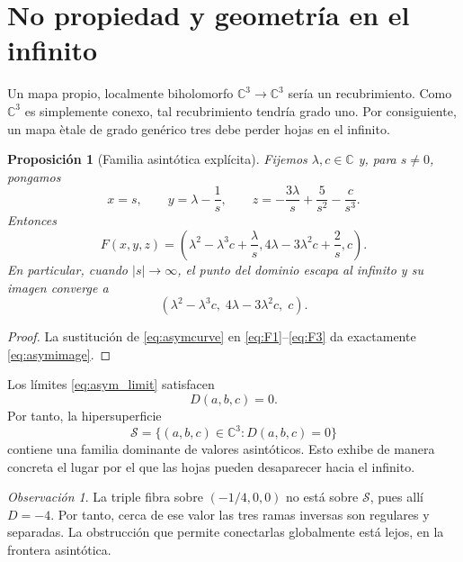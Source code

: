 \documentclass[11pt]{article}
\newtheorem{proposition}[theorem]{Proposici\'on}
\theoremstyle{definition}
\theoremstyle{remark}
\newtheorem{remark}[theorem]{Observaci\'on}
\newcommand{\C}{\mathbb{C}}
\begin{document}
\section{No propiedad y geometr\'ia en el infinito}

Un mapa propio, localmente biholomorfo $\C^3\to\C^3$ ser\'ia un recubrimiento.
Como $\C^3$ es simplemente conexo, tal recubrimiento tendr\'ia grado uno. Por
consiguiente, un mapa \`etale de grado gen\'erico tres debe perder hojas en el
infinito.

\begin{proposition}[Familia asint\'otica expl\'icita]\label{prop:asymptotic}
Fijemos $\lambda,c\in\C$ y, para $s\neq0$, pongamos
\begin{equation}\label{eq:asymcurve}
x=s,\qquad
y=\lambda-\frac1s,\qquad
z=-\frac{3\lambda}{s}+\frac5{s^2}-\frac{c}{s^3}.
\end{equation}
Entonces
\begin{equation}\label{eq:asymimage}
F(x,y,z)=
\left(
\lambda^2-\lambda^3c+\frac{\lambda}{s},
4\lambda-3\lambda^2c+\frac2s,
c
\right).
\end{equation}
En particular, cuando $|s|\to\infty$, el punto del dominio escapa al infinito
y su imagen converge a
\begin{equation}\label{eq:asym_limit}
\left(\lambda^2-\lambda^3c,\;4\lambda-3\lambda^2c,\;c\right).
\end{equation}
\end{proposition}

\begin{proof}
La sustituci\'on de \eqref{eq:asymcurve} en
\eqref{eq:F1}--\eqref{eq:F3} da exactamente \eqref{eq:asymimage}.
\end{proof}

Los l\'imites \eqref{eq:asym_limit} satisfacen
\[
D(a,b,c)=0.
\]
Por tanto, la hipersuperficie
\begin{equation}\label{eq:S}
\mathcal S=\{(a,b,c)\in\C^3:D(a,b,c)=0\}
\end{equation}
contiene una familia dominante de valores asint\'oticos. Esto exhibe de manera
concreta el lugar por el que las hojas pueden desaparecer hacia el infinito.

\begin{remark}
La triple fibra sobre $(-1/4,0,0)$ no est\'a sobre $\mathcal S$, pues all\'i
$D=-4$. Por tanto, cerca de ese valor las tres ramas inversas son regulares y
separadas. La obstrucci\'on que permite conectarlas globalmente est\'a lejos, en
la frontera asint\'otica.
\end{remark}
\end{document}
